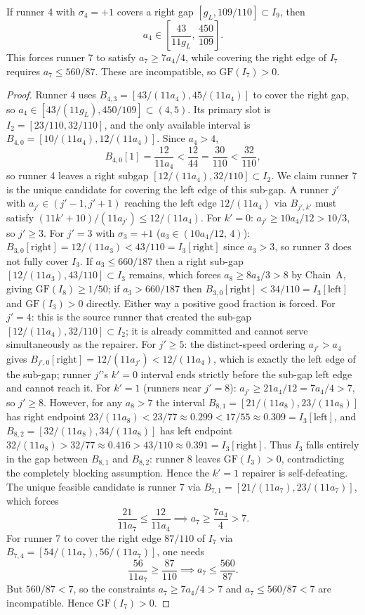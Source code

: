 \documentclass[12pt]{article}
\begin{document}
\begin{lemma}[Chain B]\label{l:54}
If runner 4 with $\sigma_4=+1$ covers a right gap
$[g_L,109/110]\subset I_9$, then
\[
a_4 \in \left[\frac{43}{11g_L},\,\frac{450}{109}\right].
\]
This forces runner 7 to satisfy $a_7\ge 7a_4/4$, while covering the right edge of $I_7$
requires $a_7\le 560/87$. These are incompatible, so $\mathrm{GF}(I_7)>0$.

\end{lemma}
\begin{proof}
Runner 4 uses $B_{4,3}=[43/(11a_4),45/(11a_4)]$ to cover the right gap, so
$a_4\in[43/(11g_L),450/109]\subset(4,5)$. Its primary slot is $I_2=[23/110,32/110]$, and
the only available interval is $B_{4,0}=[10/(11a_4),12/(11a_4)]$. Since $a_4>4$,
\[
B_{4,0}[1] = \frac{12}{11a_4} < \frac{12}{44} = \frac{30}{110} < \frac{32}{110},
\]
so runner 4 leaves a right subgap $[12/(11a_4),32/110]\subset I_2$. We claim runner 7 is
the unique candidate for covering the left edge of this sub-gap. A runner $j'$ with
$a_{j'}\in(j'-1,j'+1)$ reaching the left edge $12/(11a_4)$ via $B_{j',k'}$ must
satisfy $(11k'+10)/(11a_{j'})\le 12/(11a_4)$. For $k'=0$: $a_{j'}\ge 10a_4/12>10/3$,
so $j'\ge 3$. For $j'=3$ with $\sigma_3=+1$ ($a_3\in(10a_4/12,\,4)$):
$B_{3,0}[\text{right}]=12/(11a_3)<43/110=I_3[\text{right}]$ since $a_3>3$, so
runner 3 does not fully cover $I_3$. If $a_3\le 660/187$ then a right sub-gap
$[12/(11a_3),43/110]\subset I_3$ remains, which forces $a_8\ge 8a_3/3>8$ by Chain~A,
giving $\mathrm{GF}(I_8)\ge 1/50$; if $a_3>660/187$ then $B_{3,0}[\text{right}]
<34/110=I_3[\text{left}]$ and $\mathrm{GF}(I_3)>0$ directly. Either way a positive
good fraction is forced. For $j'=4$: this is the source runner that created the sub-gap
$[12/(11a_4),32/110]\subset I_2$; it is already committed and cannot
serve simultaneously as the repairer.
For $j'\ge 5$: the distinct-speed ordering $a_{j'}>a_4$ gives
$B_{j',0}[\text{right}]=12/(11a_{j'})<12/(11a_4)$, which is exactly
the left edge of the sub-gap; runner $j'$'s $k'=0$ interval ends
strictly before the sub-gap left edge and cannot reach it. For
$k'=1$ (runners near $j'=8$): $a_{j'}\ge 21a_4/12=7a_4/4>7$, so $j'\ge 8$.
However, for any $a_8>7$ the interval $B_{8,1}=[21/(11a_8),23/(11a_8)]$ has right
endpoint $23/(11a_8)<23/77\approx 0.299<17/55\approx 0.309=I_3[\text{left}]$,
and $B_{8,2}=[32/(11a_8),34/(11a_8)]$ has left endpoint $32/(11a_8)>32/77
\approx 0.416>43/110\approx 0.391=I_3[\text{right}]$. Thus $I_3$ falls entirely
in the gap between $B_{8,1}$ and $B_{8,2}$: runner 8 leaves $\mathrm{GF}(I_3)>0$,
contradicting the completely blocking assumption. Hence the $k'=1$ repairer is
self-defeating. The unique feasible candidate is runner 7 via
$B_{7,1}=[21/(11a_7),23/(11a_7)]$, which forces
\[
\frac{21}{11a_7} \le \frac{12}{11a_4} \implies a_7 \ge \frac{7a_4}{4} > 7.
\]
For runner 7 to cover the right edge $87/110$ of $I_7$
via $B_{7,4}=[54/(11a_7),56/(11a_7)]$, one needs
\[
\frac{56}{11a_7} \ge \frac{87}{110} \implies a_7 \le \frac{560}{87}.
\]
But $560/87<7$, so the constraints $a_7\ge 7a_4/4>7$
and $a_7\le 560/87<7$ are incompatible. Hence $\mathrm{GF}(I_7)>0$.
\end{proof}
\end{document}
